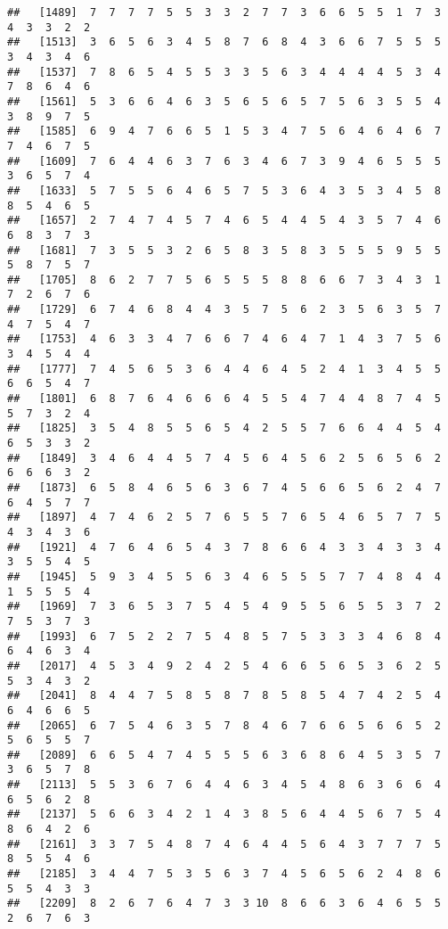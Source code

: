\documentclass[
]{book}
\begin{document}
\begin{verbatim}
##   [1489]  7  7  7  7  5  5  3  3  2  7  7  3  6  6  5  5  1  7  3  4  3  3  2  2
##   [1513]  3  6  5  6  3  4  5  8  7  6  8  4  3  6  6  7  5  5  5  3  4  3  4  6
##   [1537]  7  8  6  5  4  5  5  3  3  5  6  3  4  4  4  4  5  3  4  7  8  6  4  6
##   [1561]  5  3  6  6  4  6  3  5  6  5  6  5  7  5  6  3  5  5  4  3  8  9  7  5
##   [1585]  6  9  4  7  6  6  5  1  5  3  4  7  5  6  4  6  4  6  7  7  4  6  7  5
##   [1609]  7  6  4  4  6  3  7  6  3  4  6  7  3  9  4  6  5  5  5  3  6  5  7  4
##   [1633]  5  7  5  5  6  4  6  5  7  5  3  6  4  3  5  3  4  5  8  8  5  4  6  5
##   [1657]  2  7  4  7  4  5  7  4  6  5  4  4  5  4  3  5  7  4  6  6  8  3  7  3
##   [1681]  7  3  5  5  3  2  6  5  8  3  5  8  3  5  5  5  9  5  5  5  8  7  5  7
##   [1705]  8  6  2  7  7  5  6  5  5  5  8  8  6  6  7  3  4  3  1  7  2  6  7  6
##   [1729]  6  7  4  6  8  4  4  3  5  7  5  6  2  3  5  6  3  5  7  4  7  5  4  7
##   [1753]  4  6  3  3  4  7  6  6  7  4  6  4  7  1  4  3  7  5  6  3  4  5  4  4
##   [1777]  7  4  5  6  5  3  6  4  4  6  4  5  2  4  1  3  4  5  5  6  6  5  4  7
##   [1801]  6  8  7  6  4  6  6  6  4  5  5  4  7  4  4  8  7  4  5  5  7  3  2  4
##   [1825]  3  5  4  8  5  5  6  5  4  2  5  5  7  6  6  4  4  5  4  6  5  3  3  2
##   [1849]  3  4  6  4  4  5  7  4  5  6  4  5  6  2  5  6  5  6  2  6  6  6  3  2
##   [1873]  6  5  8  4  6  5  6  3  6  7  4  5  6  6  5  6  2  4  7  6  4  5  7  7
##   [1897]  4  7  4  6  2  5  7  6  5  5  7  6  5  4  6  5  7  7  5  4  3  4  3  6
##   [1921]  4  7  6  4  6  5  4  3  7  8  6  6  4  3  3  4  3  3  4  3  5  5  4  5
##   [1945]  5  9  3  4  5  5  6  3  4  6  5  5  5  7  7  4  8  4  4  1  5  5  5  4
##   [1969]  7  3  6  5  3  7  5  4  5  4  9  5  5  6  5  5  3  7  2  7  5  3  7  3
##   [1993]  6  7  5  2  2  7  5  4  8  5  7  5  3  3  3  4  6  8  4  6  4  6  3  4
##   [2017]  4  5  3  4  9  2  4  2  5  4  6  6  5  6  5  3  6  2  5  5  3  4  3  2
##   [2041]  8  4  4  7  5  8  5  8  7  8  5  8  5  4  7  4  2  5  4  6  4  6  6  5
##   [2065]  6  7  5  4  6  3  5  7  8  4  6  7  6  6  5  6  6  5  2  5  6  5  5  7
##   [2089]  6  6  5  4  7  4  5  5  5  6  3  6  8  6  4  5  3  5  7  3  6  5  7  8
##   [2113]  5  5  3  6  7  6  4  4  6  3  4  5  4  8  6  3  6  6  4  6  5  6  2  8
##   [2137]  5  6  6  3  4  2  1  4  3  8  5  6  4  4  5  6  7  5  4  8  6  4  2  6
##   [2161]  3  3  7  5  4  8  7  4  6  4  4  5  6  4  3  7  7  7  5  8  5  5  4  6
##   [2185]  3  4  4  7  5  3  5  6  3  7  4  5  6  5  6  2  4  8  6  5  5  4  3  3
##   [2209]  8  2  6  7  6  4  7  3  3 10  8  6  6  3  6  4  6  5  5  2  6  7  6  3

\end{verbatim}
\end{document}
